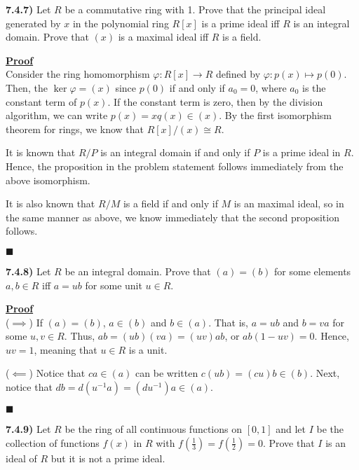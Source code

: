 \documentclass[12pt,a4paper]{article}
\newcommand{\prob}[2]{\textbf{#1)} #2}
\newenvironment{proof}
{
\textbf{\underline{Proof}} \\
}
{
\hfill $\blacksquare$
}
\begin{document}
\prob{7.4.7}{
    Let $R$ be a commutative ring with 1.
Prove that the principal ideal generated by $x$ in the polynomial ring $R[x]$ is a prime ideal iff $R$ is an integral domain.
Prove that $(x)$ is a maximal ideal iff $R$ is a field.
}

\begin{proof}
    Consider the ring homomorphism $\varphi: R[x] \to R$ defined by $\varphi: p(x) \mapsto p(0)$.
    Then, the $\ker \varphi = (x)$ since $p(0)$ if and only if $a_0 = 0$, where $a_0$ is the constant term of $p(x)$.
    If the constant term is zero, then by the division algorithm, we can write $p(x) = xq(x) \in (x)$.
    By the first isomorphism theorem for rings, we know that $R[x]/(x) \cong R$.
    
    It is known that $R/P$ is an integral domain if and only if $P$ is a prime ideal in $R$.
    Hence, the proposition in the problem statement follows immediately from the above isomorphism.

    It is also known that $R/M$ is a field if and only if $M$ is an maximal ideal, so in the same manner as above, we know immediately that the second proposition follows.
\end{proof}

\prob{7.4.8}{
Let $R$ be an integral domain.
Prove that $(a) = (b)$ for some elements $a,b \in R$ iff $a = ub$ for some unit $u \in R$.
}

\begin{proof}
    ($\implies$) If $(a) = (b)$, $a \in (b)$ and $b \in (a)$. That is, $a = ub$ and $b = va$ for some $u,v \in R$.
    Thus, $ab = (ub)(va) = (uv)ab$, or $ab(1 - uv) = 0$.
    Hence, $uv = 1$, meaning that $u \in R$ is a unit.

    ($\impliedby$) Notice that $ca \in (a)$ can be written $c(ub) = (cu)b \in (b)$.
    Next, notice that $db = d(u^{-1}a) = (du^{-1})a \in (a)$.
\end{proof}

\prob{7.4.9}{
    Let $R$  be the ring of all continuous functions on $[0,1]$ and let $I$ be the collection of functions $f(x)$ in $R$ with $f(\frac{1}{3}) = f(\frac{1}{2}) = 0$.
    Prove that $I$ is an ideal of $R$ but it is not a prime ideal.
}
\end{document}
